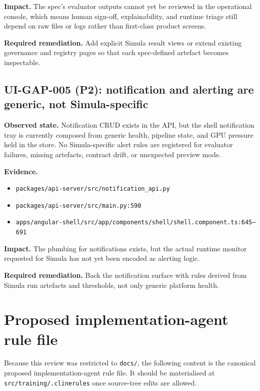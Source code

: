 \textbf{Impact.}
The spec's evaluator outputs cannot yet be reviewed in the operational
console, which means human sign-off, explainability, and runtime
triage still depend on raw files or logs rather than first-class
product screens.

\textbf{Required remediation.}
Add explicit Simula result views or extend existing governance and
registry pages so that each spec-defined artefact becomes inspectable.

\subsection*{UI-GAP-005 (P2): notification and alerting are generic, not Simula-specific}
\textbf{Observed state.}
Notification CRUD exists in the API, but the shell notification tray
is currently composed from generic health, pipeline state, and GPU
pressure held in the store. No Simula-specific alert rules are
registered for evaluator failures, missing artefacts, contract drift,
or unexpected preview mode.

\textbf{Evidence.}
\begin{itemize}
  \item \texttt{packages/api-server/src/notification\_api.py}
  \item \texttt{packages/api-server/src/main.py:590}
  \item \texttt{apps/angular-shell/src/app/components/shell/shell.component.ts:645--691}
\end{itemize}

\textbf{Impact.}
The plumbing for notifications exists, but the actual runtime monitor
requested for Simula has not yet been encoded as alerting logic.

\textbf{Required remediation.}
Back the notification surface with rules derived from Simula run
artefacts and thresholds, not only generic platform health.

\section{Proposed implementation-agent rule file}
\label{sec:simula-proposed-clinerules}
Because this review was
restricted to \texttt{docs/}, the following content is the canonical
proposed implementation-agent rule file. It should be materialised at
\texttt{src/training/.clinerules} once source-tree edits are allowed.

